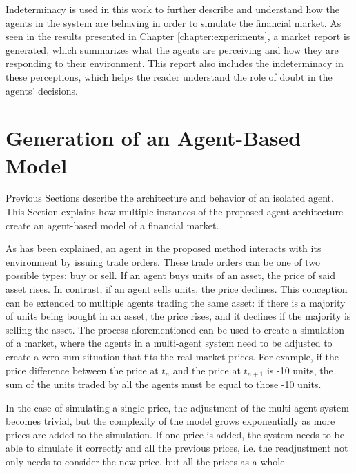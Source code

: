 Indeterminacy is used in this work to further describe and understand how the
agents in the system are behaving in order to simulate the financial market. As
seen in the results presented in Chapter \ref{chapter:experiments}, a market
report is generated, which summarizes what the agents are perceiving and how
they are responding to their environment. This report also includes the
indeterminacy in these perceptions, which helps the reader understand the role
of doubt in the agents' decisions.

\section{Generation of an Agent-Based Model}
\label{section:generation-of-an-agent-based-model}

Previous Sections describe the architecture and behavior of an isolated
agent. This Section explains how multiple instances of the proposed agent
architecture create an agent-based model of a financial market.

As has been explained, an agent in the proposed method interacts with its
environment by issuing trade orders. These trade orders can be one of two
possible types: buy or sell. If an agent buys units of an asset, the price of
said asset rises. In contrast, if an agent sells units, the price declines. This
conception can be extended to multiple agents trading the same asset: if there
is a majority of units being bought in an asset, the price rises, and it
declines if the majority is selling the asset. The process aforementioned can be
used to create a simulation of a market, where the agents in a multi-agent
system need to be adjusted to create a zero-sum situation that fits the real
market prices. For example, if the price difference between the price at $t_n$
and the price at $t_{n+1}$ is -10 units, the sum of the units traded by all the
agents must be equal to those -10 units.

In the case of simulating a single price, the adjustment of the multi-agent
system becomes trivial, but the complexity of the model grows exponentially as
more prices are added to the simulation. If one price is added, the system needs
to be able to simulate it correctly and all the previous prices, i.e. the
readjustment not only needs to consider the new price, but all the prices as a
whole.

